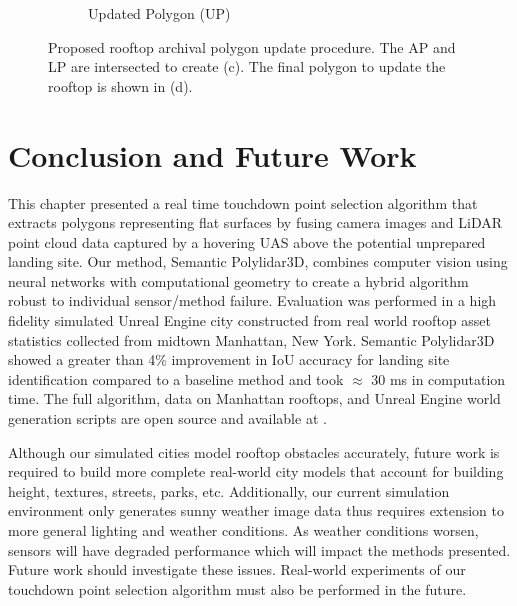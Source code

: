 \begin{figure}[ht]
\begin{subfigure}[t]{.30\linewidth}
    \caption{Updated Polygon (UP)\label{fig:ch6_map_update_d}}
  \end{subfigure}
  \caption[Proposed rooftop archival polygon update procedure]{Proposed rooftop archival polygon update procedure. The AP and LP are intersected to create (c). The final polygon to update the rooftop is shown in (d).  }\label{fig:ch6_map_upate}
\end{figure}


\section{Conclusion and Future Work}\label{sec:ch6_conclusions}

This chapter presented a real time touchdown point selection algorithm that extracts polygons representing flat surfaces by fusing camera images and LiDAR point cloud data captured by a hovering UAS above the potential unprepared landing site. 
Our method, Semantic Polylidar3D, combines computer vision using neural networks with computational geometry to create a hybrid algorithm robust to individual sensor/method failure. Evaluation was performed in a high fidelity simulated Unreal Engine city constructed from real world rooftop asset statistics collected from midtown Manhattan, New York. Semantic Polylidar3D showed a greater than 4\% improvement in IoU accuracy for landing site identification compared to a baseline method and took  $\approx$ 30 ms in computation time. The full algorithm, data on Manhattan rooftops, and Unreal Engine world generation scripts are open source and available at \cite{Castagno_Github_UnrealLanding}.

Although our simulated cities model rooftop obstacles accurately, future work is required to build more complete real-world city models that account for building height, textures, streets, parks,  etc. Additionally, our current simulation environment only generates sunny weather image data thus requires extension to more general lighting and weather conditions. As weather conditions worsen, sensors will have degraded performance which will impact the methods presented. Future work should investigate these issues.  Real-world experiments of our touchdown point selection algorithm must also be performed in the future.